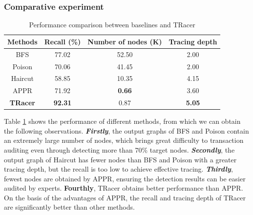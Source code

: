 \subsubsection{Comparative experiment}
\begin{table}[t]
  \caption{
  Performance comparison between baselines and TRacer
  }
  \label{tab:compared_methods}
  \begin{tabular}{cccc}
    \toprule
    Methods & Recall (\%) & Number of nodes (K) & Tracing depth\\
    \midrule
    BFS & 77.02 & 52.50 & 2.00\\
    Poison & 70.06 & 41.45 & 2.00\\
    Haircut & 58.85 & 10.35 & 4.15\\
    APPR & 71.92 & \textbf{0.66} & 3.60\\
    \textbf{TRacer} & \textbf{92.31} & 0.87 & \textbf{5.05}\\
  \bottomrule
\end{tabular}
\end{table}
Table \ref{tab:compared_methods} shows the performance of different methods, from which we can obtain the following observations.
\textbf{\textit{Firstly}}, the output graphs of BFS and Poison contain an extremely large number of nodes, which brings great difficulty to transaction auditing even through detecting more than 70\% target nodes.
\textbf{\textit{Secondly}}, the output graph of Haircut has fewer nodes than BFS and Poison with a greater tracing depth, but the recall is too low to achieve effective tracing.
\textbf{\textit{Thirdly}}, fewest nodes are obtained by APPR, ensuring the detection results can be easier audited by experts. 
\textbf{Fourthly}, TRacer obtains better performance than APPR. On the basis of the advantages of APPR, the recall and tracing depth of TRacer are significantly better than other methods.

